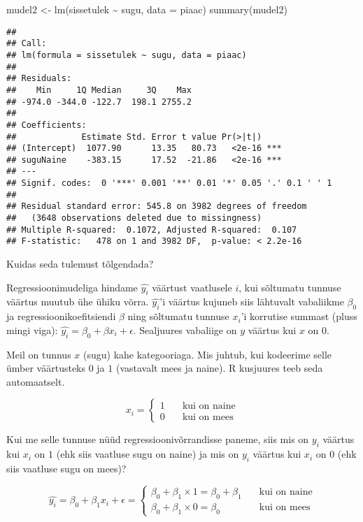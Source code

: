 \documentclass[
]{book}
\newenvironment{Shaded}{\begin{snugshade}}{\end{snugshade}}
\newcommand{\AttributeTok}[1]{\textcolor[rgb]{0.77,0.63,0.00}{#1}}
\newcommand{\FunctionTok}[1]{\textcolor[rgb]{0.00,0.00,0.00}{#1}}
\newcommand{\NormalTok}[1]{#1}
\newcommand{\OtherTok}[1]{\textcolor[rgb]{0.56,0.35,0.01}{#1}}
\newcommand{\SpecialCharTok}[1]{\textcolor[rgb]{0.00,0.00,0.00}{#1}}
\begin{document}
\begin{Shaded}
\begin{Highlighting}[]
\NormalTok{mudel2 }\OtherTok{\textless{}{-}} \FunctionTok{lm}\NormalTok{(sissetulek }\SpecialCharTok{\textasciitilde{}}\NormalTok{ sugu, }\AttributeTok{data =}\NormalTok{ piaac)}
\FunctionTok{summary}\NormalTok{(mudel2)}
\end{Highlighting}
\end{Shaded}

\begin{verbatim}
## 
## Call:
## lm(formula = sissetulek ~ sugu, data = piaac)
## 
## Residuals:
##    Min     1Q Median     3Q    Max 
## -974.0 -344.0 -122.7  198.1 2755.2 
## 
## Coefficients:
##             Estimate Std. Error t value Pr(>|t|)    
## (Intercept)  1077.90      13.35   80.73   <2e-16 ***
## suguNaine    -383.15      17.52  -21.86   <2e-16 ***
## ---
## Signif. codes:  0 '***' 0.001 '**' 0.01 '*' 0.05 '.' 0.1 ' ' 1
## 
## Residual standard error: 545.8 on 3982 degrees of freedom
##   (3648 observations deleted due to missingness)
## Multiple R-squared:  0.1072, Adjusted R-squared:  0.107 
## F-statistic:   478 on 1 and 3982 DF,  p-value: < 2.2e-16
\end{verbatim}

Kuidas seda tulemust tõlgendada?

Regressioonimudeliga hindame \(\hat{y_i}\) väärtust vaatlusele \(i\), kui sõltumatu tunnuse väärtus muutub ühe ühiku võrra. \(\hat{y_i}\)'i väärtus kujuneb siis lähtuvalt vabaliikme \(\beta_0\) ja regressioonikoefitsiendi \(\beta\) ning sõltumatu tunnuse \(x_i\)'i korrutise summast (pluss mingi viga): \(\hat{y_i}=\beta_0+\beta x_i+\epsilon\). Sealjuures vabaliige on \(y\) väärtus kui \(x\) on \(0\).

Meil on tunnus \(x\) (sugu) kahe kategooriaga. Mis juhtub, kui kodeerime selle ümber väärtusteks \(0\) ja \(1\) (vastavalt mees ja naine). R kusjuures teeb seda automaatselt.

\[ x_{i} =
  \begin{cases}
    1  & \quad \text{kui on naine}\\
    0  & \quad \text{kui on mees}
  \end{cases}
\]

Kui me selle tunnuse nüüd regressioonivõrrandisse paneme, siis mis on \(y_i\) väärtus kui \(x_i\) on \(1\) (ehk siis vaatluse sugu on naine) ja mis on \(y_i\) väärtus kui \(x_i\) on \(0\) (ehk siis vaatluse sugu on mees)?

\[ \hat{y_i}=\beta_0+\beta_1 x_i+\epsilon =
  \begin{cases}
    \beta_0+\beta_1 \times 1 = \beta_0+\beta_1  & \quad \text{kui on naine}\\
    \beta_0+\beta_1 \times 0 = \beta_0  & \quad \text{kui on mees}
  \end{cases}
\]
\end{document}

